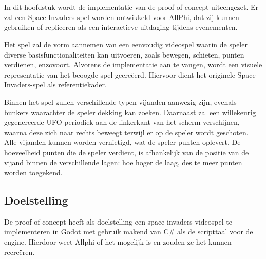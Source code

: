 
\chapter{}%
\label{ch:proof-of-concept}

In dit hoofdstuk wordt de implementatie van de proof-of-concept uiteengezet. Er zal een Space Invaders-spel worden ontwikkeld voor AllPhi, dat zij kunnen gebruiken of repliceren als een interactieve uitdaging tijdens evenementen. 

Het spel zal de vorm aannemen van een eenvoudig videospel waarin de speler diverse basisfunctionaliteiten kan uitvoeren, zoals bewegen, schieten, punten verdienen, enzovoort. Alvorens de implementatie aan te vangen, wordt een visuele representatie van het beoogde spel gecreëerd. Hiervoor dient het originele Space Invaders-spel als referentiekader.

Binnen het spel zullen verschillende typen vijanden aanwezig zijn, evenals bunkers waarachter de speler dekking kan zoeken. Daarnaast zal een willekeurig gegenereerde UFO periodiek aan de linkerkant van het scherm verschijnen, waarna deze zich naar rechts beweegt terwijl er op de speler wordt geschoten. Alle vijanden kunnen worden vernietigd, wat de speler punten oplevert. De hoeveelheid punten die de speler verdient, is afhankelijk van de positie van de vijand binnen de verschillende lagen: hoe hoger de laag, des te meer punten worden toegekend.

\section{Doelstelling}
De proof of concept heeft als doelstelling een space-invaders videospel te implementeren in Godot met gebruik makend van C\# als de scripttaal voor de engine. Hierdoor weet Allphi of het mogelijk is en zouden ze het kunnen recreëren.

